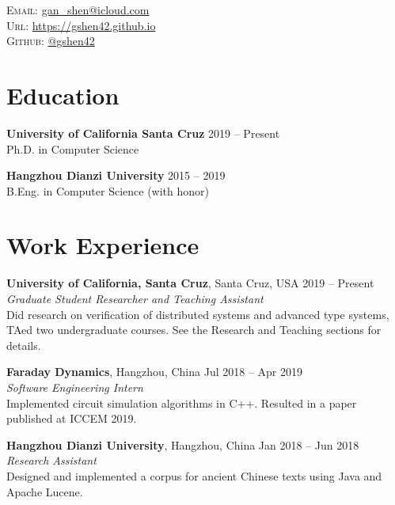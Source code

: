 \documentclass[letterpaper, 11pt, oneside]{article}
\begin{document}

\vspace{\baselineskip} \noindent \textsc{Email}: \href{mailto:gan_shen@icloud.com}{gan\_shen@icloud.com} \\
\noindent \textsc{Url}: \href{https://gshen42.github.io}{https://gshen42.github.io} \\
\noindent \textsc{Github}: \href{https://github.com/gshen42}{@gshen42}

\section*{Education}
    \textbf{University of California Santa Cruz} \hfill 2019 -- Present \\
    Ph.D. in Computer Science

    \vspace{\baselineskip} \noindent \textbf{Hangzhou Dianzi University} \hfill 2015 -- 2019 \\
    B.Eng. in Computer Science (with honor)

\section*{Work Experience}
    \noindent \textbf{University of California, Santa Cruz}, Santa Cruz, USA \hfill 2019 -- Present \\
    \emph{Graduate Student Researcher and Teaching Assistant} \\
    Did research on verification of distributed systems and advanced type systems, TAed two undergraduate courses.
    See the Research and Teaching sections for details.

    \vspace{\baselineskip} \noindent \textbf{Faraday Dynamics}, Hangzhou, China \hfill Jul 2018 -- Apr 2019 \\
    \emph{Software Engineering Intern} \\
    Implemented circuit simulation algorithms in C++. Resulted in a paper published at ICCEM 2019.

    \vspace{\baselineskip} \noindent \textbf{Hangzhou Dianzi University}, Hangzhou, China \hfill Jan 2018 -- Jun 2018 \\
    \emph{Research Assistant} \\
    Designed and implemented a corpus for ancient Chinese texts using Java and Apache Lucene.
\end{document}

